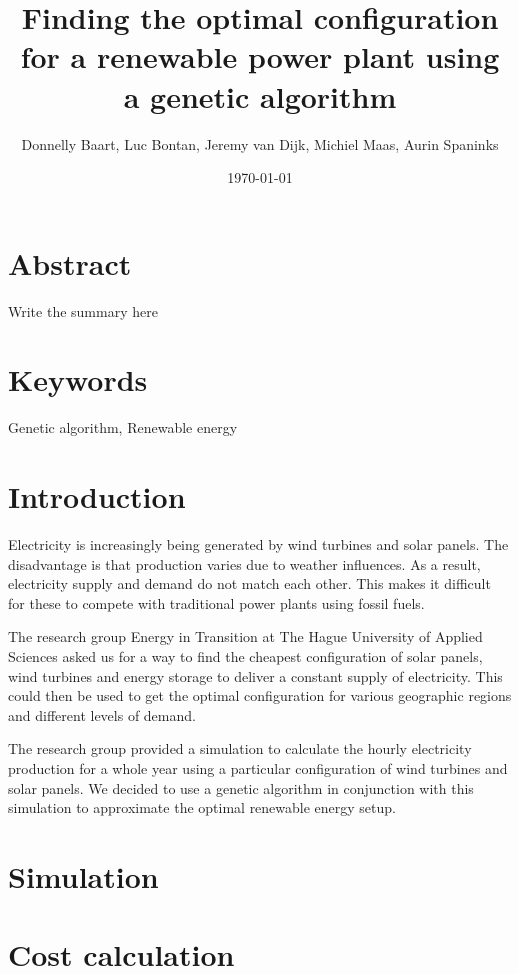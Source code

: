 \documentclass[12pt]{article}
\begin{document}
\title{Finding the optimal configuration for a renewable power plant using a genetic algorithm}
\author{Donnelly Baart, Luc Bontan, Jeremy van Dijk, Michiel Maas, Aurin Spaninks}
\date{\today}
\maketitle

\section*{Abstract}

Write the summary here

\section*{Keywords}

Genetic algorithm, Renewable energy


\newpage

\section{Introduction}
Electricity is increasingly being generated by wind turbines and solar panels. The disadvantage is that production varies due to weather influences. As a result, electricity supply and demand do not match each other. This makes it difficult for these to compete with traditional power plants using fossil fuels.

The research group Energy in Transition at The Hague University of Applied Sciences asked us for a way to find the cheapest configuration of solar panels, wind turbines and energy storage to deliver a constant supply of electricity. This could then be used to get the optimal configuration for various geographic regions and different levels of demand.

The research group provided a simulation to calculate the hourly electricity production for a whole year using a particular configuration of wind turbines and solar panels. We decided to use a genetic algorithm in conjunction with this simulation to approximate the optimal renewable energy setup.

\section{Simulation}

\section{Cost calculation}
\end{document}
